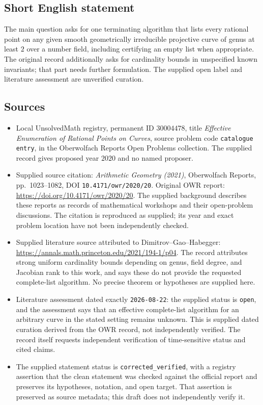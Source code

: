 \documentclass[11pt]{article}
\begin{document}
\subsection{Short English statement}
The main question asks for one terminating algorithm that lists every rational point on any given smooth geometrically irreducible projective curve of genus at least \(2\) over a number field, including certifying an empty list when appropriate. The original record additionally asks for cardinality bounds in unspecified known invariants; that part needs further formulation. The supplied open label and literature assessment are unverified curation.
\subsection{Sources}
\begin{itemize}
\item Local UnsolvedMath registry, permanent ID \(30004478\), title \emph{Effective Enumeration of Rational Points on Curves}, source problem code \texttt{catalogue entry}, in the Oberwolfach Reports Open Problems collection. The supplied record gives proposed year \(2020\) and no named proposer.
\item Supplied source citation: \emph{Arithmetic Geometry (2021)}, Oberwolfach Reports, pp.\ 1023--1082, DOI \texttt{10.4171/owr/2020/20}. Original OWR report: \url{https://doi.org/10.4171/owr/2020/20}. The supplied background describes these reports as records of mathematical workshops and their open-problem discussions. The citation is reproduced as supplied; its year and exact problem location have not been independently checked.
\item Supplied literature source attributed to Dimitrov--Gao--Habegger: \url{https://annals.math.princeton.edu/2021/194-1/p04}. The record attributes strong uniform cardinality bounds depending on genus, field degree, and Jacobian rank to this work, and says these do not provide the requested complete-list algorithm. No precise theorem or hypotheses are supplied here.
\item Literature assessment dated exactly \texttt{2026-08-22}: the supplied status is \texttt{open}, and the assessment says that an effective complete-list algorithm for an arbitrary curve in the stated setting remains unknown. This is supplied dated curation derived from the OWR record, not independently verified. The record itself requests independent verification of time-sensitive status and cited claims.
\item The supplied statement status is \texttt{corrected\_verified}, with a registry assertion that the clean statement was checked against the official report and preserves its hypotheses, notation, and open target. That assertion is preserved as source metadata; this draft does not independently verify it.
\end{itemize}
\end{document}
